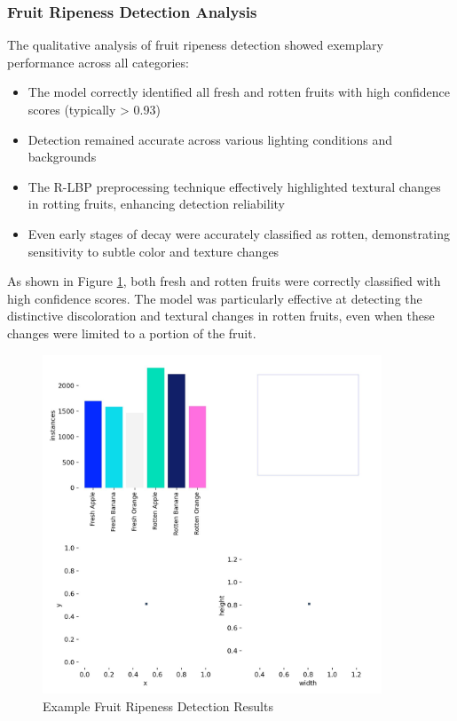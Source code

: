 \begin{multicols}{2}
\subsubsection{Fruit Ripeness Detection Analysis}

The qualitative analysis of fruit ripeness detection showed exemplary performance across all categories:

\begin{itemize}
    \item The model correctly identified all fresh and rotten fruits with high confidence scores (typically > 0.93)
    \item Detection remained accurate across various lighting conditions and backgrounds
    \item The R-LBP preprocessing technique effectively highlighted textural changes in rotting fruits, enhancing detection reliability
    \item Even early stages of decay were accurately classified as rotten, demonstrating sensitivity to subtle color and texture changes
\end{itemize}

As shown in Figure \ref{fig:fruit_examples}, both fresh and rotten fruits were correctly classified with high confidence scores. The model was particularly effective at detecting the distinctive discoloration and textural changes in rotten fruits, even when these changes were limited to a portion of the fruit.
\end{multicols}

\begin{figure}[ht]
\centering
\includegraphics[width=0.9\textwidth]{datas/agriculture/labels.jpg}
\caption{Example Fruit Ripeness Detection Results}
\label{fig:fruit_examples}
\end{figure}

